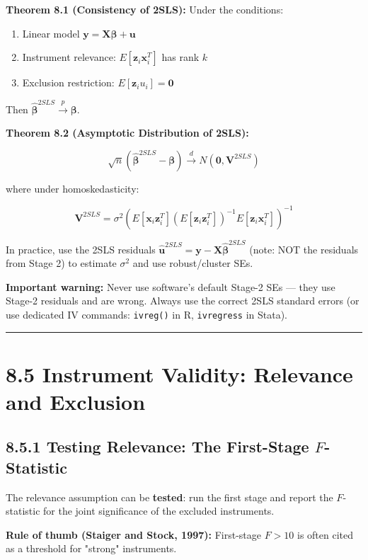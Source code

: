 \textbf{Theorem 8.1 (Consistency of 2SLS):} Under the conditions:
\begin{enumerate}
\item Linear model $\mathbf{y} = \mathbf{X}\boldsymbol{\beta} + \mathbf{u}$
\item Instrument relevance: $E[\mathbf{z}_i \mathbf{x}_i^T]$ has rank $k$
\item Exclusion restriction: $E[\mathbf{z}_i u_i] = \mathbf{0}$
\end{enumerate}

Then $\hat{\boldsymbol{\beta}}^{2SLS} \xrightarrow{p} \boldsymbol{\beta}$.

\textbf{Theorem 8.2 (Asymptotic Distribution of 2SLS):}

\[
\sqrt{n}(\hat{\boldsymbol{\beta}}^{2SLS} - \boldsymbol{\beta}) \xrightarrow{d} N\!\left(\mathbf{0}, \mathbf{V}^{2SLS}\right)
\]

where under homoskedasticity:

\[
\mathbf{V}^{2SLS} = \sigma^2 \left(E[\mathbf{x}_i \mathbf{z}_i^T]\left(E[\mathbf{z}_i\mathbf{z}_i^T]\right)^{-1}E[\mathbf{z}_i\mathbf{x}_i^T]\right)^{-1}
\]

In practice, use the 2SLS residuals $\hat{\mathbf{u}}^{2SLS} = \mathbf{y} - \mathbf{X}\hat{\boldsymbol{\beta}}^{2SLS}$ (note: NOT the residuals from Stage 2) to estimate $\sigma^2$ and use robust/cluster SEs.

\textbf{Important warning:} Never use software's default Stage-2 SEs --- they use Stage-2 residuals and are wrong. Always use the correct 2SLS standard errors (or use dedicated IV commands: \texttt{ivreg()} in R, \texttt{ivregress} in Stata).

\medskip\hrule\medskip

\section{8.5 Instrument Validity: Relevance and Exclusion}

\subsection{8.5.1 Testing Relevance: The First-Stage $F$-Statistic}

The relevance assumption can be \textbf{tested}: run the first stage and report the $F$-statistic for the joint significance of the excluded instruments.

\textbf{Rule of thumb (Staiger and Stock, 1997):} First-stage $F > 10$ is often cited as a threshold for "strong" instruments.

